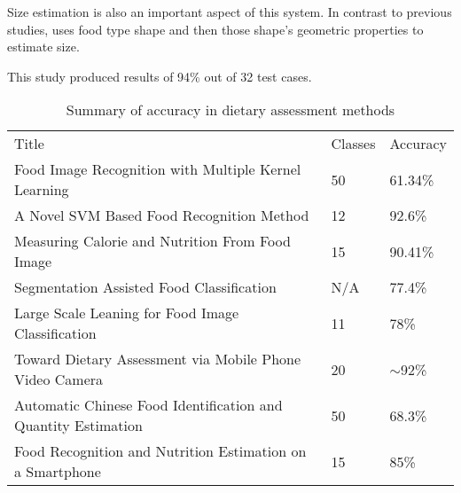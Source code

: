 Size estimation is also an important aspect of this system.
In contrast to previous studies, \parencite{snap} uses food type shape and then those shape's geometric properties to estimate size.

This study produced results of 94\% out of 32 test cases.


\begin{table}[]
\centering
\caption{Summary of accuracy in dietary assessment methods}
\label{other_dietary_summary}
\begin{tabular}{lll}
Title                                                         & Classes & Accuracy   \\
Food Image Recognition with Multiple Kernel Learning          & 50             & 61.34\%    \\
A Novel SVM Based Food Recognition Method                     & 12             & 92.6\%     \\
Measuring Calorie and Nutrition From Food Image               & 15             & 90.41\%    \\
Segmentation Assisted Food Classification                     & N/A            & 77.4\%     \\
Large Scale Leaning for Food Image Classification             & 11             & 78\%       \\
Toward Dietary Assessment via Mobile Phone Video Camera       & 20             & $\sim$92\% \\
Automatic Chinese Food Identification and Quantity Estimation & 50             & 68.3\%     \\
Food Recognition and Nutrition Estimation on a Smartphone      & 15             & 85\%      
\end{tabular}
\end{table}